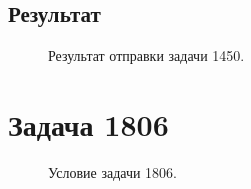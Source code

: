 \documentclass[a5paper, 10pt]{article}
\theoremstyle{definition}
\theoremstyle{plain}
\theoremstyle{remark}
\begin{document}
\subsection{Результат}
\begin{figure}[h!]
\caption{Результат отправки задачи 1450.}
\end{figure}









\newpage

\section{Задача 1806}

\begin{figure}[h!]
\caption{Условие задачи 1806.}
\end{figure}
\end{document}
